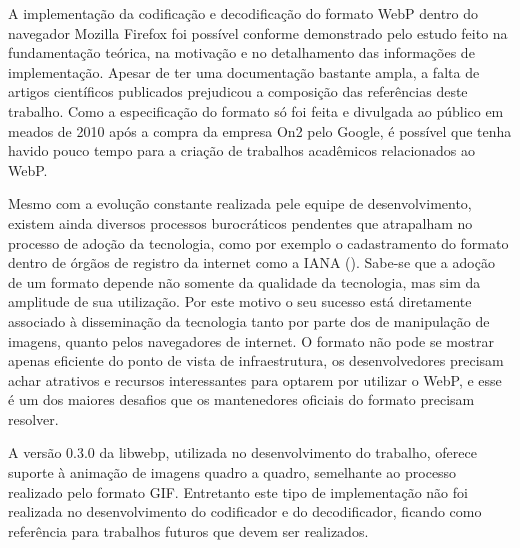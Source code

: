 \documentclass[espaco=simples,appendix=Name]{abnt}
\begin{document}
A implementação da codificação e decodificação do formato WebP dentro do navegador Mozilla Firefox foi possível conforme demonstrado pelo estudo feito na fundamentação teórica, na motivação e no detalhamento das informações de implementação. Apesar de ter uma documentação bastante ampla, a falta de artigos científicos publicados prejudicou a composição das referências deste trabalho. Como a especificação do formato só foi feita e divulgada ao público em meados de 2010 após a compra da empresa On2 pelo Google, é possível que tenha havido pouco tempo para a criação de trabalhos acadêmicos relacionados ao WebP.

Mesmo com a evolução constante realizada pele equipe de desenvolvimento, existem ainda diversos processos burocráticos pendentes que atrapalham no processo de adoção da tecnologia, como por exemplo o cadastramento do formato dentro de órgãos de registro da internet como a IANA (). Sabe-se que a adoção de um formato depende não somente da qualidade da tecnologia, mas sim da amplitude de sua utilização. Por este motivo o seu sucesso está diretamente associado à disseminação da tecnologia tanto por parte dos  de manipulação de imagens, quanto pelos navegadores de internet. O formato não pode se mostrar apenas eficiente do ponto de vista de infraestrutura, os desenvolvedores precisam achar atrativos e recursos interessantes para optarem por utilizar o WebP, e esse é um dos maiores desafios que os mantenedores oficiais do formato precisam resolver.

A versão 0.3.0 da libwebp, utilizada no desenvolvimento do trabalho, oferece suporte à animação de imagens quadro a quadro, semelhante ao processo realizado pelo formato GIF. Entretanto este tipo de implementação não foi realizada no desenvolvimento do codificador e do decodificador, ficando como referência para trabalhos futuros que devem ser realizados.


\end{document}

